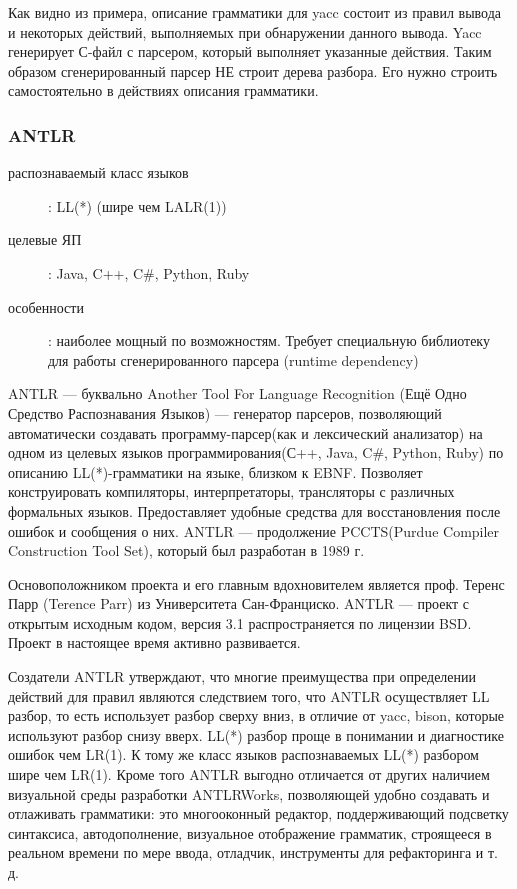 \documentclass[a4paper,12pt]{article}
\begin{document}
Как видно из примера, описание грамматики для yacc состоит из правил вывода и
некоторых действий, выполняемых при обнаружении данного вывода.
Yacc генерирует С-файл с парсером, который выполняет указанные действия.
Таким образом сгенерированный парсер НЕ строит дерева разбора. Его нужно строить
самостоятельно в действиях описания грамматики.

\subsubsection*{ANTLR}
\begin{description}
  \item[распознаваемый класс языков]: LL(*) (шире чем LALR(1))
  \item[целевые ЯП]: Java, C++, C\#, Python, Ruby
  \item[особенности]: наиболее мощный по возможностям. Требует специальную
  библиотеку для работы сгенерированного парсера (runtime dependency)
\end{description}
ANTLR — буквально Another Tool For Language Recognition (Ещё Одно Средство
Распознавания Языков) — генератор парсеров, позволяющий автоматически создавать
программу-парсер(как и лексический анализатор) на одном из целевых языков
программирования(С++, Java, C\#, Python, Ruby) по описанию LL(*)-грамматики на
языке, близком к EBNF. Позволяет конструировать компиляторы, интерпретаторы,
трансляторы с различных формальных языков. Предоставляет удобные средства для
восстановления после ошибок и сообщения о них. ANTLR — продолжение PCCTS(Purdue
Compiler Construction Tool Set), который был разработан в 1989 г.

Основоположником проекта и его главным вдохновителем является проф. Теренс Парр
(Terence Parr) из Университета Сан-Франциско. ANTLR — проект с открытым
исходным кодом, версия 3.1 распространяется по лицензии BSD. Проект в
настоящее время активно развивается.

Создатели ANTLR утверждают, что многие преимущества при определении действий
для правил являются следствием того, что ANTLR осуществляет LL разбор, то есть
использует разбор сверху вниз, в отличие от yacc, bison, которые
используют разбор снизу вверх. LL(*) разбор проще в понимании и
диагностике ошибок чем LR(1). К тому же класс языков распознаваемых LL(*)
разбором шире чем LR(1). Кроме того ANTLR выгодно отличается от других наличием
визуальной среды разработки ANTLRWorks, позволяющей удобно создавать и
отлаживать грамматики: это многооконный редактор, поддерживающий подсветку
синтаксиса, автодополнение, визуальное отображение грамматик, строящееся в
реальном времени по мере ввода, отладчик, инструменты для рефакторинга и т. д.
\end{document}
